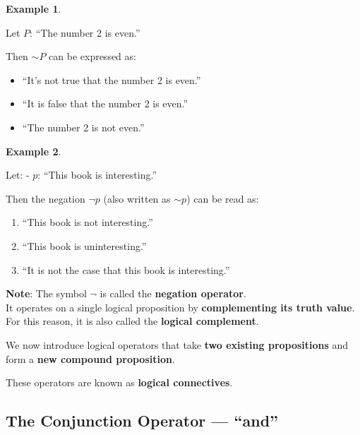\documentclass[
]{book}
\providecommand{\tightlist}{%
  \setlength{\itemsep}{0pt}\setlength{\parskip}{0pt}}
\theoremstyle{definition}
\theoremstyle{definition}
\newtheorem{example}{Example}[chapter]
\theoremstyle{definition}
\theoremstyle{definition}
\theoremstyle{remark}
\begin{document}
\begin{example}
\protect\hypertarget{exm:unnamed-chunk-14}{}\label{exm:unnamed-chunk-14}

Let \(P\): ``The number 2 is even.''

Then \(\sim P\) can be expressed as:

\begin{itemize}
\tightlist
\item
  ``It's not true that the number 2 is even.''
\item
  ``It is false that the number 2 is even.''
\item
  ``The number 2 is not even.''
\end{itemize}

\end{example}

\begin{example}
\protect\hypertarget{exm:unnamed-chunk-15}{}\label{exm:unnamed-chunk-15}

Let:
- \(p\): ``This book is interesting.''

Then the negation \(\lnot p\) (also written as \(\sim p\)) can be read as:

\begin{enumerate}
\def\labelenumi{\arabic{enumi}.}
\tightlist
\item
  ``This book is not interesting.''
\item
  ``This book is uninteresting.''
\item
  ``It is not the case that this book is interesting.''
\end{enumerate}

\end{example}

\textbf{Note}:
The symbol \(\lnot\) is called the \textbf{negation operator}.\\
It operates on a single logical proposition by \textbf{complementing its truth value}.\\
For this reason, it is also called the \textbf{logical complement}.

We now introduce logical operators that take \textbf{two existing propositions} and form a \textbf{new compound proposition}.

These operators are known as \textbf{logical connectives}.

\subsection{The Conjunction Operator --- ``and''}\label{the-conjunction-operator-and}
\end{document}
